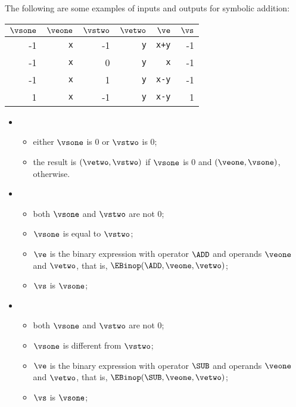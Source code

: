 The following are some examples of inputs and outputs for symbolic addition:
\begin{center}
\begin{tabular}{rrrrrr}
\textbf{$\vsone$} & \textbf{$\veone$} & \textbf{$\vstwo$} & \textbf{$\vetwo$} & \textbf{$\ve$} & \textbf{$\vs$}\\
\hline
-1 & \verb|x| & -1 & \verb|y| & \verb|x+y| & -1\\
-1 & \verb|x| & 0 & \verb|y| & \verb|x| & -1\\
-1 & \verb|x| & 1 & \verb|y| & \verb|x-y| & -1\\
1 & \verb|x| & -1 & \verb|y| & \verb|x-y| & 1\\
\end{tabular}
\end{center}

\ProseParagraph
\OneApplies
\begin{itemize}
  \item {}
  \begin{itemize}
    \item either $\vsone$ is $0$ or $\vstwo$ is $0$;
    \item the result is $(\vetwo, \vstwo)$ if $\vsone$ is $0$ and $(\veone, \vsone)$, otherwise.
  \end{itemize}

  \item {}
  \begin{itemize}
    \item both $\vsone$ and $\vstwo$ are not $0$;
    \item $\vsone$ is equal to $\vstwo$;
    \item $\ve$ is the binary expression with operator $\ADD$ and operands $\veone$ and $\vetwo$,
          that is, $\EBinop(\ADD, \veone, \vetwo)$;
    \item $\vs$ is $\vsone$;
  \end{itemize}

  \item {}
  \begin{itemize}
    \item both $\vsone$ and $\vstwo$ are not $0$;
    \item $\vsone$ is different from $\vstwo$;
    \item $\ve$ is the binary expression with operator $\SUB$ and operands $\veone$ and $\vetwo$,
          that is, $\EBinop(\SUB, \veone, \vetwo)$;
    \item $\vs$ is $\vsone$;
  \end{itemize}
\end{itemize}

